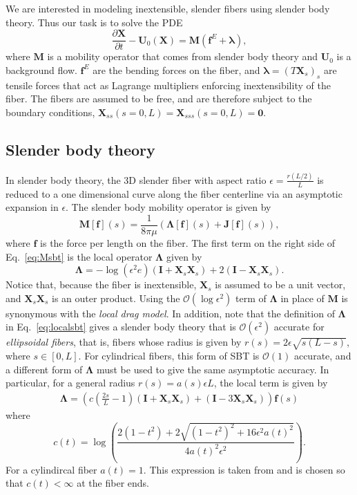 We are interested in modeling inextensible, slender fibers using slender body theory. Thus our task is to solve the PDE
\begin{equation}
\label{eq:fibevcont}
\frac{\partial \bm{X}}{\partial t} -\bm{U}_0(\bm{X})= \bm{M}\left(\bm{f}^{E}+\bm{\lambda}\right),
\end{equation}
where $\bm{M}$ is a mobility operator that comes from slender body theory and $\bm{U}_0$ is a background flow. $\bm{f}^E$ are the bending forces on the fiber, and $\bm{\lambda}=(T\bm{X}_s)_s$ are tensile forces that act as Lagrange multipliers enforcing inextensibility of the fiber. The fibers are assumed to be free, and are therefore subject to the boundary conditions, $\displaystyle \bm{X}_{ss}\left(s=0,L\right)=\bm{X}_{sss}\left(s=0,L\right)=\bm{0}$. 

\subsection{Slender body theory}
In slender body theory, the 3D slender fiber with aspect ratio $\displaystyle{\epsilon = \frac{r(L/2)}{L}}$ is reduced to a one dimensional curve along the fiber centerline via an asymptotic expansion in $\epsilon$. The slender body mobility operator is given by
\begin{equation}
\label{eq:Msbt}
\bm{M}[\bm{f}](s) =\frac{1}{8\pi \mu}\left( \bm{ \Lambda}[\bm{f}](s)+\bm{J}[\bm{f}](s)\right),
\end{equation}
where $\bm{f}$ is the force per length on the fiber. The first term on the right side of Eq.\ \eqref{eq:Msbt} is the local operator $\bm{\Lambda}$ given by
\begin{equation}
\label{eq:localsbt}
\bm{\Lambda}=-\log{(\epsilon^2 e)}(\bm{I}+\bm{X}_s \bm{X}_s) + 2(\bm{I}-\bm{X}_s \bm{X}_s). 
\end{equation}
Notice that, because the fiber is inextensible, $\bm{X}_s$ is assumed to be a unit vector, and $\bm{X}_s \bm{X}_s$ is an outer product. Using the $\mathcal{O}(\log{\epsilon^2})$ term of $\bm{\Lambda}$ in place of $\bm{M}$ is synonymous with the \textit{local drag model}. In addition, note that the definition of $\bm{\Lambda}$ in Eq.\ \eqref{eq:localsbt} gives a slender body theory that is $\mathcal{O}(\epsilon^2)$ accurate for \textit{ellipsoidal fibers}, that is, fibers whose radius is given by $r(s)=2\epsilon \sqrt{s(L-s)}$, where $s\in[0,L]$. For cylindrical fibers, this form of SBT is $\mathcal{O}(1)$ accurate, and a different form of $\bm{\Lambda}$ must be used to give the same asymptotic accuracy. In particular, for a general radius $r(s)=a(s)\epsilon L$, the local term is given by  
\begin{align}
\label{eq:c_t_general}
\bm{\Lambda} =\left(c\left(\frac{2s}{L}-1\right)(\bm{I}+\bm{X}_s\bm{X}_s) +  (\bm{I}-3\bm{X}_s\bm{X}_s)\right)\bm{f}(s)
\end{align}
where
\begin{equation}
c(t) = \log{\left(\frac{2(1-t^2)+2\sqrt{(1-t^2)^2+16\epsilon^2a(t)^2}}{4a(t)^2\epsilon^2}\right)}.
\end{equation}
For a cylindircal fiber $a(t)=1$. This expression is taken from \cite{morifree} and is chosen so that $c(t) < \infty$ at the fiber ends.

